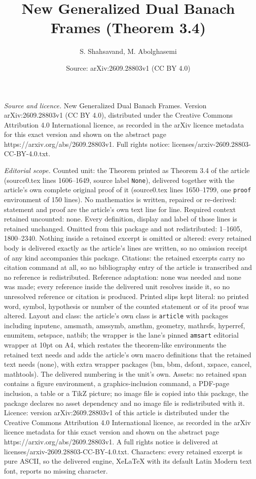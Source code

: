\documentclass[10pt,a4paper]{amsart}
\title[New Generalized Dual Banach Frames]{New Generalized Dual Banach Frames (Theorem 3.4)}
\author{S. Shahsavand, M. Abolghasemi}
\date{Source: arXiv:2609.28803v1 (CC BY 4.0)}
\begin{document}
\maketitle

\noindent\emph{Source and licence.} New Generalized Dual Banach Frames. Version arXiv:2609.28803v1 (CC BY 4.0), distributed under the Creative Commons Attribution 4.0 International licence, as recorded in the arXiv licence metadata for this exact version and shown on the abstract page https://arxiv.org/abs/2609.28803v1. Full rights notice: licenses/arxiv-2609.28803-CC-BY-4.0.txt.\par\smallskip

\noindent\textit{Editorial scope.} Counted unit: the Theorem printed as Theorem 3.4 of the article (source0.tex lines 1606--1649, source label \texttt{None}), delivered together with the article's own complete original proof of it (source0.tex lines 1650--1799, one \texttt{proof} environment of 150 lines). No mathematics is written, repaired or re-derived: statement and proof are the article's own text line for line. Required context retained uncounted: none. Every definition, display and label of those lines is retained unchanged. Omitted from this package and not redistributed: 1--1605, 1800--2340. Nothing inside a retained excerpt is omitted or altered: every retained body is delivered exactly as the article's lines are written, so no omission receipt of any kind accompanies this package. Citations: the retained excerpts carry no citation command at all, so no bibliography entry of the article is transcribed and no reference is redistributed. Reference adaptation: none was needed and none was made; every reference inside the delivered unit resolves inside it, so no unresolved reference or citation is produced. Printed slips kept literal: no printed word, symbol, hypothesis or number of the counted statement or of its proof was altered. Layout and class: the article's own class is \texttt{article} with packages including inputenc, amsmath, amssymb, amsthm, geometry, mathrsfs, hyperref, enumitem, setspace, natbib; the wrapper is the lane's pinned \texttt{amsart} editorial wrapper at 10pt on A4, which restates the theorem-like environments the retained text needs and adds the article's own macro definitions that the retained text needs (none), with extra wrapper packages (bm, bbm, dsfont, xspace, cancel, mathtools). The delivered numbering is the unit's own. Assets: no retained span contains a figure environment, a graphics-inclusion command, a PDF-page inclusion, a table or a TikZ picture; no image file is copied into this package, the package declares no asset dependency and no image file is redistributed with it. Licence: version arXiv:2609.28803v1 of this article is distributed under the Creative Commons Attribution 4.0 International licence, as recorded in the arXiv licence metadata for this exact version and shown on the abstract page https://arxiv.org/abs/2609.28803v1. A full rights notice is delivered at licenses/arxiv-2609.28803-CC-BY-4.0.txt. Characters: every retained excerpt is pure ASCII, so the delivered engine, XeLaTeX with its default Latin Modern text font, reports no missing character.
\end{document}
